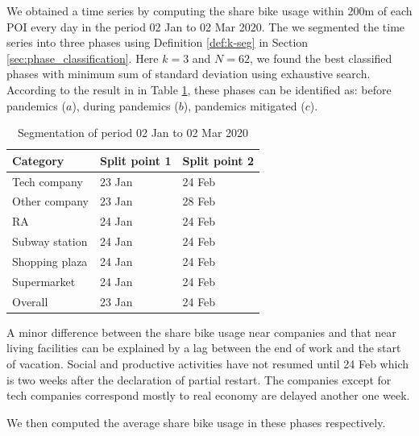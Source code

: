 \documentclass[ijgi,submit,moreauthors,pdftex]{Definitions/mdpi}
\begin{document}
We obtained a time series by computing the share bike usage within 200m of each POI every day in the period 02 Jan to 02 Mar 2020.
The we segmented the time series into three phases using Definition \ref{def:k-seg} in Section \ref{sec:phase_classification}.
Here $k=3$ and $N=62$, we found the best classified phases with minimum sum of standard deviation using exhaustive search.
According to the result in in Table \ref{tab:segment}, these phases can be identified as: before pandemics ($a$), during pandemics ($b$), pandemics mitigated ($c$).

\begin{table}[ht]
	\centering
	\begin{tabular}{|l|l|l|}
		\hline
		Category & Split point 1 & Split point 2\\
		\hline
		Tech company & 23 Jan & 24 Feb\\
		\hline
		Other company & 23 Jan & 28 Feb\\
		\hline
		RA & 24 Jan & 24 Feb\\
		\hline
		Subway station & 24 Jan & 24 Feb\\
		\hline
		Shopping plaza & 24 Jan & 24 Feb\\
		\hline
		Supermarket & 24 Jan & 24 Feb\\
		\hline
		Overall & 23 Jan & 24 Feb \\
		\hline
	\end{tabular}
	\caption{Segmentation of period 02 Jan to 02 Mar 2020}\label{tab:segment}
\end{table}

A minor difference between the share bike usage near companies and that near living facilities can be explained by a lag between the end of work and the start of vacation.
Social and productive activities have not resumed until 24 Feb which is two weeks after the declaration of partial restart.
The companies except for tech companies correspond mostly to real economy are delayed another one week.

We then computed the average share bike usage in these phases respectively.
\end{document}
